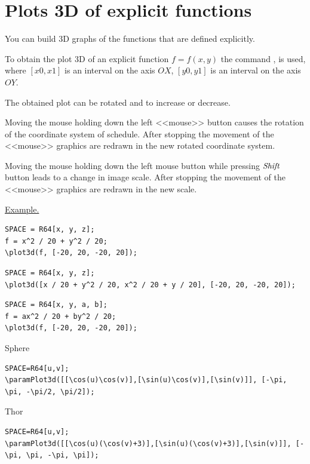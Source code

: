 \section{Plots 3D of explicit functions} 
You can build 3D graphs of the functions that are defined explicitly. 
 
To obtain the plot 3D of an explicit function $f=f(x,y)$ the command 
, 
 is used, where $[x0, x1]$ is an interval on the axis $OX$, $[y0, y1]$ is an interval on the axis $OY$.

The obtained plot can be rotated and to increase or decrease.

Moving the mouse holding down the left <<mouse>> button causes the rotation of the coordinate system of schedule.
After stopping the movement of the <<mouse>> graphics are redrawn in the new rotated coordinate system.
 
Moving the mouse holding down the left mouse button while pressing ${\it Shift}$ button leads 
to a change in image scale. After stopping the movement of the <<mouse>> graphics are redrawn in the new scale.

\underline{Example. }

\vspace*{-2mm}

\begin{verbatim}
SPACE = R64[x, y, z];
f = x^2 / 20 + y^2 / 20;
\plot3d(f, [-20, 20, -20, 20]);
\end{verbatim}

\begin{verbatim}
SPACE = R64[x, y, z];
\plot3d([x / 20 + y^2 / 20, x^2 / 20 + y / 20], [-20, 20, -20, 20]);
\end{verbatim}

\begin{verbatim}
SPACE = R64[x, y, a, b];
f = ax^2 / 20 + by^2 / 20;
\plot3d(f, [-20, 20, -20, 20]);
\end{verbatim}

Sphere 

\begin{verbatim}
SPACE=R64[u,v];
\paramPlot3d([[\cos(u)\cos(v)],[\sin(u)\cos(v)],[\sin(v)]], [-\pi, \pi, -\pi/2, \pi/2]);
\end{verbatim}

Thor 

\begin{verbatim}
SPACE=R64[u,v];
\paramPlot3d([[\cos(u)(\cos(v)+3)],[\sin(u)(\cos(v)+3)],[\sin(v)]], [-\pi, \pi, -\pi, \pi]);
\end{verbatim}

